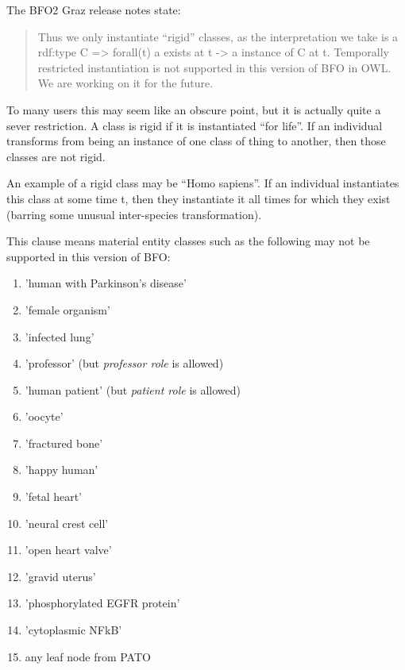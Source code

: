 \documentclass{bioinfo}
\begin{document}
The BFO2 Graz release notes state:

\begin{quotation}

  Thus we only instantiate ``rigid'' classes, as the interpretation we
  take is a rdf:type C => forall(t) a exists at t -> a instance of C
  at t. Temporally restricted instantiation is not supported in this
  version of BFO in OWL. We are working on it for the future.

\end{quotation}

To many users this may seem like an obscure point, but it is actually
quite a sever restriction. A class is rigid if it is instantiated
``for life''. If an individual transforms from being an instance of
one class of thing to another, then those classes are not rigid.

An example of a rigid class may be ``Homo sapiens''. If an individual
instantiates this class at some time t, then they instantiate it all
times for which they exist (barring some unusual inter-species
transformation).

This clause means material entity classes such as the following may
not be supported in this version of BFO:

\begin{enumerate}

  \item 'human with Parkinson's disease'
  \item 'female organism'
  \item 'infected lung'
  \item 'professor' (but \emph{professor role} is allowed)
  \item 'human patient' (but \emph{patient role} is allowed)
  \item 'oocyte'
  \item 'fractured bone'
  \item 'happy human'
  \item 'fetal heart'
  \item 'neural crest cell'
  \item 'open heart valve'
  \item 'gravid uterus'
  \item 'phosphorylated EGFR protein'
  \item 'cytoplasmic NFkB'
  \item any leaf node from PATO

\end{enumerate}
\end{document}
